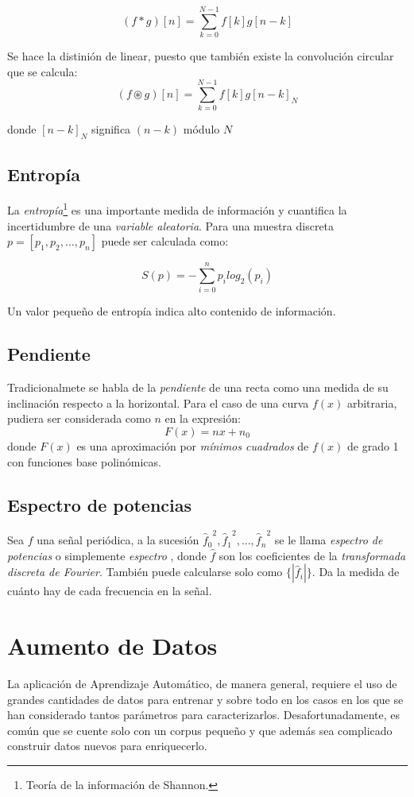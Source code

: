 $$ (f*g)[n] = \sum\limits_{k=0}^{N-1} f[k]g[n-k]$$


Se hace la distini\'on de linear, puesto que tambi\'en existe la convoluci\'on circular que se calcula:
 $$ (f \circledast g)[n] = \sum\limits_{k=0}^{N-1} f[k]g[n-k]_N$$ 
 
 donde $[n-k]_N$ significa $(n-k)$ m\'odulo $N$

\subsection{Entrop\'ia}
La \emph{entrop\'ia}\footnote{Teor\'ia de la informaci\'on de Shannon.} \cite{addison2017illustrated} \cite[p.703]{russell2002artificial} es una importante medida de informaci\'on  y cuantifica la incertidumbre de una \emph{variable aleatoria}. Para una muestra discreta $p = [p_1, p_2, ..., p_n]$ puede ser calculada como: 

   $$ S(p) = -\sum_{i=0}^n p_i log_2(p_i) $$
   
Un valor peque\~no de entrop\'ia indica alto contenido de informaci\'on. 

\subsection{Pendiente}
Tradicionalmete se habla de la \emph{pendiente} de una recta como una medida de su inclinaci\'on respecto a la horizontal. Para el caso de una curva $f(x)$ arbitraria, pudiera ser considerada como $n$ en la expresi\'on: $$F(x) = nx + n_0$$ donde
$F(x)$ es una aproximaci\'on  por \emph{m\'inimos cuadrados} \cite[p.59]{gautschinumerical} de $f(x)$ de grado 1 con funciones base polin\'omicas. 


\subsection{Espectro de potencias}
 Sea $f$ una se\~nal peri\'odica, a la sucesi\'on ${\hat{f}_0}^2, {\hat{f}_1}^2, ..., {\hat{f}_n}^2$ se le llama \emph{espectro de potencias} o simplemente \emph{espectro} \cite{hansen2014fourier}, donde $\hat{f}$ son los coeficientes de la \emph{transformada discreta de Fourier}. Tambi\'en puede calcularse solo como $\{|\hat{f}_i|\}$. Da la medida de cu\'anto hay de cada frecuencia en la se\~nal.

\section{Aumento de Datos} \label{aumento}
La aplicaci\'on de Aprendizaje Autom\'atico, de manera general, requiere el uso de grandes cantidades de datos
para entrenar y sobre todo en los casos en los que se han considerado tantos par\'ametros para caracterizarlos. Desafortunadamente, es com\'un que se cuente solo con un corpus peque\~no y que adem\'as sea complicado construir datos nuevos para enriquecerlo.  


